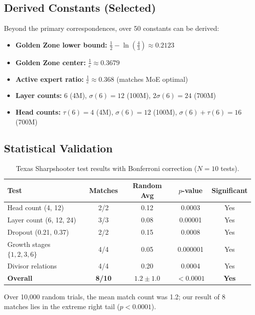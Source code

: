 \documentclass[12pt]{article}
\begin{document}
\subsection{Derived Constants (Selected)}

Beyond the primary correspondences, over 50 constants can be derived:

\begin{itemize}
    \item \textbf{Golden Zone lower bound:} $\frac{1}{2} - \ln\!\left(\frac{4}{3}\right) \approx 0.2123$
    \item \textbf{Golden Zone center:} $\frac{1}{e} \approx 0.3679$
    \item \textbf{Active expert ratio:} $\frac{1}{e} \approx 0.368$ (matches MoE optimal)
    \item \textbf{Layer counts:} $6$ (4M), $\sigma(6)=12$ (100M), $2\sigma(6)=24$ (700M)
    \item \textbf{Head counts:} $\tau(6)=4$ (4M), $\sigma(6)=12$ (100M), $\sigma(6)+\tau(6)=16$ (700M)
\end{itemize}

\subsection{Statistical Validation}

\begin{table}[h]
\centering
\begin{tabular}{lcccc}
\toprule
Test & Matches & Random Avg & $p$-value & Significant \\
\midrule
Head count (4, 12) & 2/2 & 0.12 & 0.0003 & Yes \\
Layer count (6, 12, 24) & 3/3 & 0.08 & 0.00001 & Yes \\
Dropout (0.21, 0.37) & 2/2 & 0.15 & 0.0008 & Yes \\
Growth stages $\{1,2,3,6\}$ & 4/4 & 0.05 & 0.000001 & Yes \\
Divisor relations & 4/4 & 0.20 & 0.0004 & Yes \\
\midrule
\textbf{Overall} & \textbf{8/10} & $1.2 \pm 1.0$ & $< 0.0001$ & \textbf{Yes} \\
\bottomrule
\end{tabular}
\caption{Texas Sharpshooter test results with Bonferroni correction ($N=10$ tests).}
\label{tab:stats}
\end{table}

Over 10,000 random trials, the mean match count was 1.2; our result of 8 matches lies in the extreme right tail ($p < 0.0001$).
\end{document}
